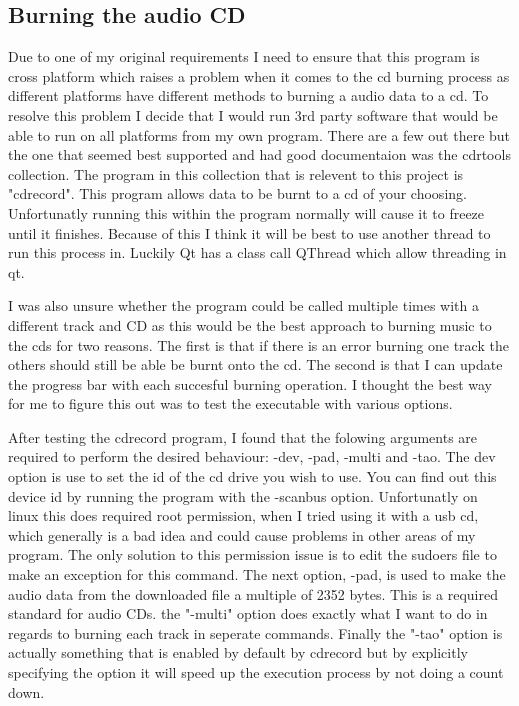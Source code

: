 \documentclass{article}
\begin{document}
\subsection{Burning the audio CD}
Due to one of my original requirements I need to ensure that this program is cross platform
which raises a problem when it comes to the cd burning process as different platforms have
different methods to burning a audio data to a cd. To resolve this problem I decide that
I would run 3rd party software that would be able to run on all platforms from my own
program. There are a few out there but the one that seemed best supported and had good
documentaion was the cdrtools collection. The program in this collection that is relevent
to this project is "cdrecord". This program allows data to be burnt to a cd of your choosing.
Unfortunatly running this within the program normally will cause it to freeze until it finishes.
Because of this I think it will be best to use another thread to run this process in. Luckily
Qt has a class call QThread which allow threading in qt.

I was also unsure whether the program could be called multiple times with a different track
and CD as this would be the best approach to burning music to the cds for two reasons. The
first is that if there is an error burning one track the others should still be able be burnt
onto the cd. The second is that I can update the progress bar with each succesful burning operation.
I thought the best way for me to figure this out was to test the executable with various options.

After testing the cdrecord program, I found that the folowing arguments are required to perform the
desired behaviour: -dev, -pad, -multi and -tao. The dev option is use to set the id of the
cd drive you wish to use. You can find out this device id by running the program with the -scanbus
option. Unfortunatly on linux this does required root permission, when I tried using it with a
usb cd, which generally is a bad idea and could cause problems in other areas of my program. The
only solution to this permission issue is to edit the sudoers file to make an exception for this
command. The next option, -pad, is used to make the audio data from the downloaded file a multiple
of 2352 bytes. This is a required standard for audio CDs. the "-multi" option does exactly what
I want to do in regards to burning each track in seperate commands. Finally the "-tao" option is
actually something that is enabled by default by cdrecord but by explicitly specifying the option
it will speed up the execution process by not doing a count down.
\end{document}
